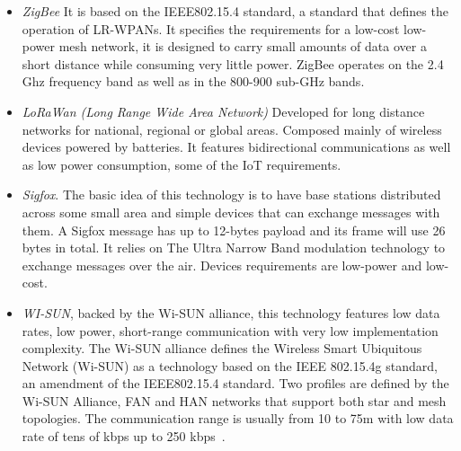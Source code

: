 \begin{itemize}
\item \emph{ZigBee} It is based on the IEEE802.15.4 standard, a standard that defines the operation of LR-WPANs. It specifies the requirements for a low-cost low-power mesh network, it is designed to carry small amounts of data over a short distance while consuming very little power. ZigBee  operates  on the 2.4 Ghz frequency band as well as in the 800-900 sub-GHz bands. 

\item \emph{LoRaWan (Long Range Wide Area Network)}  Developed for long distance networks for national, regional or global areas. Composed mainly of wireless devices powered by batteries. It features bidirectional communications as well as low power consumption, some of the IoT requirements.  

\item \emph{Sigfox}. The basic idea of this technology is to have base stations distributed across some small area and simple devices that can exchange messages with them. A Sigfox message has up to 12-bytes payload and its frame will use 26 bytes in total. It relies on The Ultra Narrow Band modulation technology to exchange messages over the air. Devices requirements are low-power and low-cost. 

\item \emph{WI-SUN}, backed by the Wi-SUN alliance, this technology features low data rates, low power, short-range communication with very low implementation complexity. The Wi-SUN alliance defines the Wireless Smart Ubiquitous Network (Wi-SUN) as a technology
based on the IEEE 802.15.4g standard, an amendment of the IEEE802.15.4 standard. Two profiles are defined by the Wi-SUN Alliance, FAN and HAN networks that support both star and mesh topologies. The communication range is usually from 10 to 75m with low data rate of tens of kbps up to 250 kbps~\cite{sato2015smart}. 

\end{itemize}


